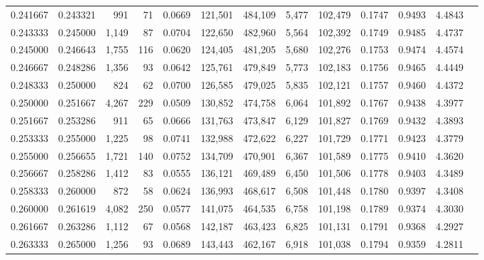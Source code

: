 \begin{tabular}{rrrrrrrrrrrrr}
0.241667 & 0.243321 &   991 &  71 &                                     0.0669 & 121,501 & 484,109 &   5,477 & 102,479 & 0.1747 & 0.9493 & 4.4843 \\
0.243333 & 0.245000 & 1,149 &  87 &                                     0.0704 & 122,650 & 482,960 &   5,564 & 102,392 & 0.1749 & 0.9485 & 4.4737 \\
0.245000 & 0.246643 & 1,755 & 116 &                                     0.0620 & 124,405 & 481,205 &   5,680 & 102,276 & 0.1753 & 0.9474 & 4.4574 \\
0.246667 & 0.248286 & 1,356 &  93 &                                     0.0642 & 125,761 & 479,849 &   5,773 & 102,183 & 0.1756 & 0.9465 & 4.4449 \\
0.248333 & 0.250000 &   824 &  62 &                                     0.0700 & 126,585 & 479,025 &   5,835 & 102,121 & 0.1757 & 0.9460 & 4.4372 \\
0.250000 & 0.251667 & 4,267 & 229 &                                     0.0509 & 130,852 & 474,758 &   6,064 & 101,892 & 0.1767 & 0.9438 & 4.3977 \\
0.251667 & 0.253286 &   911 &  65 &                                     0.0666 & 131,763 & 473,847 &   6,129 & 101,827 & 0.1769 & 0.9432 & 4.3893 \\
0.253333 & 0.255000 & 1,225 &  98 &                                     0.0741 & 132,988 & 472,622 &   6,227 & 101,729 & 0.1771 & 0.9423 & 4.3779 \\
0.255000 & 0.256655 & 1,721 & 140 &                                     0.0752 & 134,709 & 470,901 &   6,367 & 101,589 & 0.1775 & 0.9410 & 4.3620 \\
0.256667 & 0.258286 & 1,412 &  83 &                                     0.0555 & 136,121 & 469,489 &   6,450 & 101,506 & 0.1778 & 0.9403 & 4.3489 \\
0.258333 & 0.260000 &   872 &  58 &                                     0.0624 & 136,993 & 468,617 &   6,508 & 101,448 & 0.1780 & 0.9397 & 4.3408 \\
0.260000 & 0.261619 & 4,082 & 250 &                                     0.0577 & 141,075 & 464,535 &   6,758 & 101,198 & 0.1789 & 0.9374 & 4.3030 \\
0.261667 & 0.263286 & 1,112 &  67 &                                     0.0568 & 142,187 & 463,423 &   6,825 & 101,131 & 0.1791 & 0.9368 & 4.2927 \\
0.263333 & 0.265000 & 1,256 &  93 &                                     0.0689 & 143,443 & 462,167 &   6,918 & 101,038 & 0.1794 & 0.9359 & 4.2811 \\

\end{tabular}
